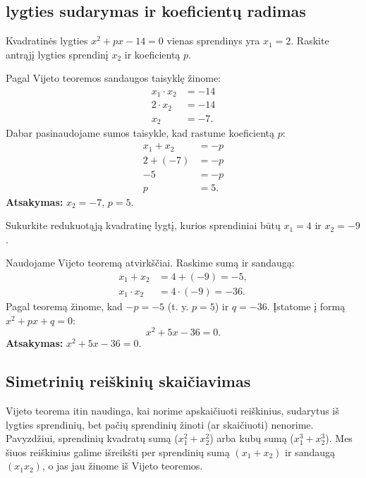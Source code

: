 \documentclass[11pt,a4paper]{scrartcl}
\begin{document}
\subsection{lygties sudarymas ir koeficientų radimas}

\begin{example}
Kvadratinės lygties $x^2 + px - 14 = 0$ vienas sprendinys yra $x_1 = 2$. Raskite antrąjį lygties sprendinį $x_2$ ir koeficientą $p$.
\end{example}
\begin{solution}
Pagal Vijeto teoremos sandaugos taisyklę žinome:
\[
\begin{aligned}
x_1 \cdot x_2 &= -14 \\
2 \cdot x_2 &= -14 \\
x_2 &= -7.
\end{aligned}
\]
Dabar pasinaudojame sumos taisykle, kad rastume koeficientą $p$:
\[
\begin{aligned}
x_1 + x_2 &= -p \\
2 + (-7) &= -p \\
-5 &= -p \\
p &= 5.
\end{aligned}
\]
\textbf{Atsakymas:} $x_2 = -7$, $p = 5$.
\end{solution}

\begin{example}
Sukurkite redukuotąją kvadratinę lygtį, kurios sprendiniai būtų $x_1 = 4$ ir $x_2 = -9$.
\end{example}
\begin{solution}
Naudojame Vijeto teoremą atvirkščiai. Raskime sumą ir sandaugą:
\[
\begin{aligned}
x_1 + x_2 &= 4 + (-9) = -5, \\
x_1 \cdot x_2 &= 4 \cdot (-9) = -36.
\end{aligned}
\]
Pagal teoremą žinome, kad $-p = -5$ (t. y. $p = 5$) ir $q = -36$.
Įstatome į formą $x^2 + px + q = 0$:
\[ x^2 + 5x - 36 = 0. \]
\textbf{Atsakymas:} $x^2 + 5x - 36 = 0$.
\end{solution}

\subsection{Simetrinių reiškinių skaičiavimas}

Vijeto teorema itin naudinga, kai norime apskaičiuoti reiškinius, sudarytus iš lygties sprendinių, bet pačių sprendinių žinoti (ar skaičiuoti) nenorime. Pavyzdžiui, sprendinių kvadratų sumą ($x_1^2 + x_2^2$) arba kubų sumą ($x_1^3 + x_2^3$). Mes šiuos reiškinius galime išreikšti per sprendinių sumą $(x_1+x_2)$ ir sandaugą $(x_1x_2)$, o jas jau žinome iš Vijeto teoremos.
\end{document}
